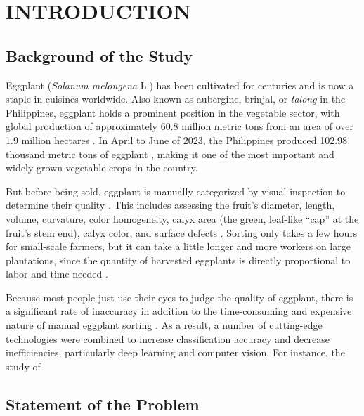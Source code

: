 \chapter{INTRODUCTION}

{\baselineskip
\section{Background of the Study}
Eggplant (\textit{Solanum melongena} L.) has been cultivated for centuries and is now a staple in cuisines worldwide. Also known as aubergine, brinjal, or \textit{talong} in the Philippines, eggplant holds a prominent position in the vegetable sector, with global production of approximately 60.8 million metric tons from an area of over 1.9 million hectares \citep{FAOSTAT_EggplantProduction}. In April to June of 2023, the Philippines produced 102.98 thousand metric tons of eggplant \citep{PSA_Eggplant_2023}, making it one of the most important and widely grown vegetable crops in the country.

But before being sold, eggplant is manually categorized by visual inspection to determine their quality \citep{sun2025novel}. This includes assessing the fruit's diameter, length, volume, curvature, color homogeneity, calyx area (the green, leaf-like “cap” at the fruit's stem end), calyx color, and surface defects \citep{lyu2025agronomic,lalam2025automatic}. Sorting only takes a few hours for small-scale farmers, but it can take a little longer and more workers on large plantations, since the quantity of harvested eggplants is directly proportional to labor and time needed \citep{Khan2025UsingCV}.

Because most people just use their eyes to judge the quality of eggplant, there is a significant rate of inaccuracy in addition to the time-consuming and expensive nature of manual eggplant sorting \citep{Waghmare2025Comprehensive}.  As a result, a number of cutting-edge technologies were combined to increase classification accuracy and decrease inefficiencies, particularly deep learning and computer vision.  For instance, the study of



\section{Statement of the Problem}

}
